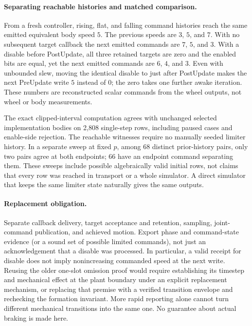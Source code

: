 \documentclass{article}
\begin{document}
\paragraph{Separating reachable histories and matched comparison.}
From a fresh controller, rising, flat, and falling command histories
reach the same emitted equivalent body speed $5$. The previous speeds are
$3$, $5$, and $7$. With no subsequent target callback the next emitted
commands are $7$, $5$, and $3$. With a disable before PostUpdate, all
three retained targets are zero and the enabled bits are equal, yet the
next emitted commands are $6$, $4$, and $3$. Even with unbounded slew,
moving the identical disable to just after PostUpdate makes the next
PreUpdate write $5$ instead of $0$; the zero takes one further awake
iteration. These numbers are reconstructed scalar commands from the
wheel outputs, not wheel or body measurements.

The exact clipped-interval computation agrees with unchanged selected
implementation bodies on 2,808 single-step rows, including paused cases
and enable-side rejection. The reachable witnesses require no manually
seeded limiter history. In a separate sweep at fixed $p$, among 68
distinct prior-history pairs, only two pairs agree at both endpoints;
66 have an endpoint command separating them. These sweeps include
possible algebraically valid initial rows, not claims that every row was
reached in transport or a whole simulator. A direct simulator that keeps
the same limiter state naturally gives the same outputs.

\paragraph{Replacement obligation.}
Separate callback delivery, target acceptance and retention, sampling,
joint-command publication, and achieved motion. Export phase and
command-state evidence (or a sound set of possible limited commands),
not just an acknowledgement that a disable was processed. In particular,
a valid receipt for disable does not imply nonincreasing commanded speed
at the next write. Reusing the older one-slot omission proof would require
establishing its timestep and mechanical effect at the plant boundary
under an explicit replacement mechanism, or replacing that premise with
a verified transition envelope and rechecking the formation invariant.
More rapid reporting alone cannot turn different mechanical transitions
into the same one. No guarantee about actual braking is made here.
\end{document}
